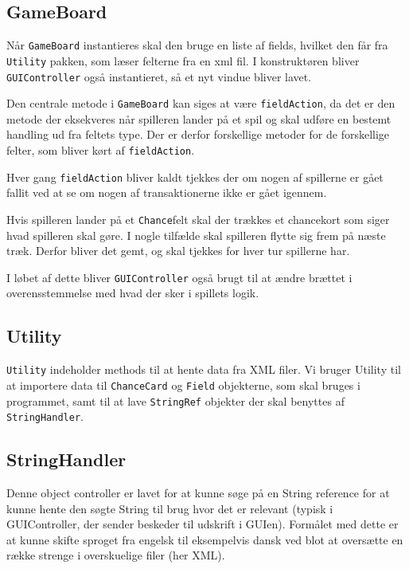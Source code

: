 \subsection{GameBoard}
Når \texttt{GameBoard} instantieres skal den bruge en liste af fields, hvilket den får fra \texttt{Utility} pakken, som læser felterne fra en xml fil. I konstruktøren bliver \texttt{GUIController} også instantieret, så et nyt vindue bliver lavet. 

Den centrale metode i \texttt{GameBoard} kan siges at være \texttt{fieldAction}, da det er den metode der eksekveres når spilleren lander på et spil og skal udføre en bestemt handling ud fra feltets type. Der er derfor forskellige metoder for de forskellige felter, som bliver kørt af \texttt{fieldAction}. 

Hver gang \texttt{fieldAction} bliver kaldt tjekkes der om nogen af spillerne er gået fallit ved at se om nogen af transaktionerne ikke er gået igennem. 

Hvis spilleren lander på et \texttt{Chance}felt skal der trækkes et chancekort som siger hvad spilleren skal gøre. I nogle tilfælde skal spilleren flytte sig frem på næste træk. Derfor bliver det gemt, og skal tjekkes for hver tur spillerne har.


I løbet af dette bliver \texttt{GUIController} også brugt til at ændre brættet i overensstemmelse med hvad der sker i spillets logik.
\subsection{Utility}
\texttt{Utility} indeholder methods til at hente data fra XML filer. Vi bruger Utility til at importere data til \texttt{ChanceCard} og \texttt{Field} objekterne, som skal bruges i programmet, samt til at lave \texttt{StringRef} objekter der skal benyttes af \texttt{StringHandler}. 

\subsection{StringHandler}
Denne object controller er lavet for at kunne søge på en String reference for at kunne hente den søgte String til brug hvor det er relevant (typisk i GUIController, der sender beskeder til udskrift i GUIen). Formålet med dette er at kunne skifte sproget fra engelsk til eksempelvis dansk ved blot at oversætte en række strenge i overskuelige filer (her XML).
